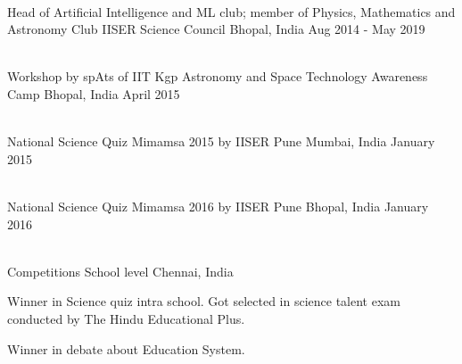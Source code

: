 \begin{cventries}
~\\[-5mm]
\cventry
{Head of Artificial Intelligence and ML club; member of Physics, Mathematics and Astronomy Club} %
{IISER Science Council} %
{ Bhopal, India} %
{Aug 2014 - May 2019} %
{ %
}

~\\[-5mm]
\cventry
{Workshop by spAts of IIT Kgp} %
{Astronomy and Space Technology Awareness Camp} %
{ Bhopal, India} %
{ April 2015} %
{ %
}

~\\[-5mm]
\cventry
{National Science Quiz} %
{Mimamsa 2015 by IISER Pune} %
{ Mumbai, India} %
{ January 2015} %
{ %
}

~\\[-5mm]
\cventry
{National Science Quiz} %
{Mimamsa 2016 by IISER Pune} %
{ Bhopal, India} %
{ January 2016} %
{ %
}

~\\[-5mm]
\cventry
{Competitions} %
{School level} %
{Chennai, India} %
{ } %
{ %
\begin{cvitems}
\item {Winner in Science quiz intra school. Got selected in science talent exam conducted by The Hindu Educational Plus.}
\item {Winner in debate about Education System.}
\end{cvitems}
}


\end{cventries}
